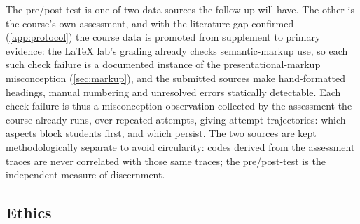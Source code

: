 The pre/post-test is one of two data sources the follow-up will have.
The other is the course's own assessment, and with the literature gap
confirmed (\cref{app:protocol}) the course data is promoted from
supplement to primary evidence: the LaTeX lab's grading already checks
semantic-markup use, so each such check failure is a documented instance
of the presentational-markup misconception (\cref{sec:markup}), and the
submitted sources make hand-formatted headings, manual numbering and
unresolved errors statically detectable.
Each check failure is thus a misconception observation collected by the
assessment the course already runs, over repeated attempts, giving
attempt trajectories: which aspects block students first, and which
persist.
The two sources are kept methodologically separate to avoid
circularity: codes derived from the assessment traces are never
correlated with those same traces; the pre/post-test is the independent
measure of discernment.

\subsection{Ethics}
\label{sec:ethics}

